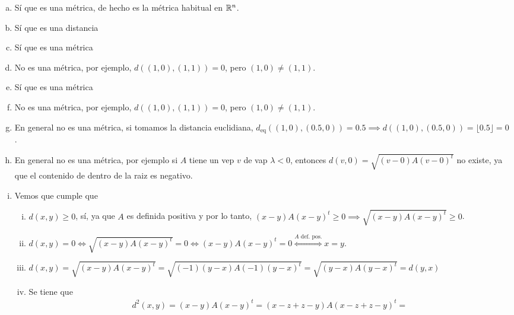 \begin{ej}
	\begin{enumerate}[(a)]
		\item Sí que es una m\'etrica, de hecho es la m\'etrica habitual en $\mathbb{R}^n$.
			\begin{center}
				
			\end{center}
		\item Sí que es una distancia
			\begin{center}
				
			\end{center}
		\item Sí que es una m\'etrica
			\begin{center}
				
			\end{center}
		\item No es una m\'etrica, por ejemplo, $d\left( (1,0), (1,1) \right) = 0$, pero $(1,0) \neq (1,1)$.
		\item Sí que es una m\'etrica
			\begin{center}
				
			\end{center}
		\item No es una m\'etrica, por ejemplo, $d\left( (1,0), (1,1) \right) = 0$, pero $(1,0) \neq (1,1)$.
		\item En general no  es una m\'etrica, si tomamos la distancia euclidiana, $d_{\text{eq}} \left( (1, 0) , (0.5, 0) \right) = 0.5 \implies
			d\left( (1,0), (0.5, 0) \right) = \lfloor0.5 \rfloor = 0$.
		\item En general no es una m\'etrica, por ejemplo si $A$ tiene un vep $v$ de vap $\lambda < 0$, entonces $d(v, 0) = \sqrt{(v - 0) A (v-0)^t}$ no existe,
			ya que el contenido de dentro de la raiz es negativo.
		\item Vemos que cumple que
			\begin{enumerate}[i)]
				\item $d(x, y) \geq 0$, sí, ya que $A$ es definida positiva y por lo tanto, $(x-y)A(x-y)^t \geq 0 \implies \sqrt{(x-y)A(x-y)^t} \geq 0$.
				\item $d(x, y) = 0 \iff \sqrt{(x-y)A(x-y)^t} = 0 \iff (x-y)A(x-y)^t = 0 \stackrel{A \text{ def. pos.}}{\iff} x = y$.
				\item $d(x, y) = \sqrt{(x-y)A(x-y)^t} = \sqrt{(-1)(y-x)A(-1)(y-x)^t} = \sqrt{(y-x)A(y-x)^t} = d(y, x)$
				\item Se tiene que
					\begin{gather*}
						d^2(x,y) = (x-y)A(x-y)^t = (x-z+z-y)A(x-z+z-y)^t = \\

\end{gather*}
\end{enumerate}
\end{enumerate}
\end{ej}
